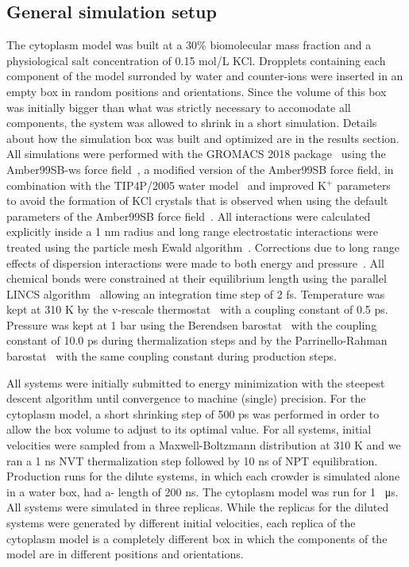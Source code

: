 \documentclass[journal=jcisd8,manuscript=article]{achemso}
\begin{document}
\subsection{General simulation setup}
The cytoplasm model was built at a 30\% biomolecular mass fraction and
a physiological salt concentration of 0.15 mol/L KCl. Dropplets containing each component of the model surronded by water and counter-ions were inserted in an empty box in random positions and orientations. Since the volume of this box was initially bigger than what was strictly necessary to accomodate all components, the system was allowed to shrink in a short simulation. Details about how the simulation box was built and optimized are in the results section. All
simulations were performed with the GROMACS 2018
package~\cite{Abraham2015a,Pronk2013a} using the Amber99SB-ws force
field~\cite{Best2014a}, a modified version of the Amber99SB force
field, in combination with the TIP4P/2005 water
model~\cite{Abascal2005b} and improved K$^+$ parameters~\cite{Dang1995a} to avoid the formation of KCl crystals that is observed when using the default parameters of the Amber99SB force field~\cite{Auffinger2007a}. All interactions were calculated explicitly
inside a 1 nm radius and long range electrostatic interactions were
treated using the particle mesh Ewald
algorithm~\cite{Essmann1995a}. Corrections due to long range effects
of dispersion interactions were made to both energy and
pressure~\cite{Allen1987a}. All chemical bonds were constrained at
their equilibrium length using the parallel LINCS
algorithm~\cite{Hess1997a,Hess2008b} allowing an integration time step
of 2 fs. Temperature was kept at 310 K by the v-rescale
thermostat~\cite{Bussi2007a} with a coupling constant of 0.5
ps. Pressure was kept at 1 bar using the Berendsen
barostat~\cite{Berendsen1984a} with the coupling constant of 10.0 ps
during thermalization steps and by the Parrinello-Rahman
barostat~\cite{Parrinello1981a} with the same coupling constant during
production steps.

All systems were initially submitted to energy minimization with the
steepest descent algorithm until convergence to machine (single)
precision. For the cytoplasm model, a short shrinking step of 500 ps
was performed in order to allow the box volume to adjust to its
optimal value. For all systems, initial velocities were sampled from a
Maxwell-Boltzmann distribution at 310 K and we ran a 1 ns NVT
thermalization step followed by 10 ns of NPT equilibration. Production
runs for the dilute systems, in which each crowder is simulated alone
in a water box, had a- length of 200 ns. The cytoplasm model was run
for 1 \SI{}{\micro\second}. All systems were simulated in three
replicas. While the replicas for the diluted systems were generated by
different initial velocities, each replica of the cytoplasm model is a
completely different box in which the components of the model are in
different positions and orientations.
\end{document}
